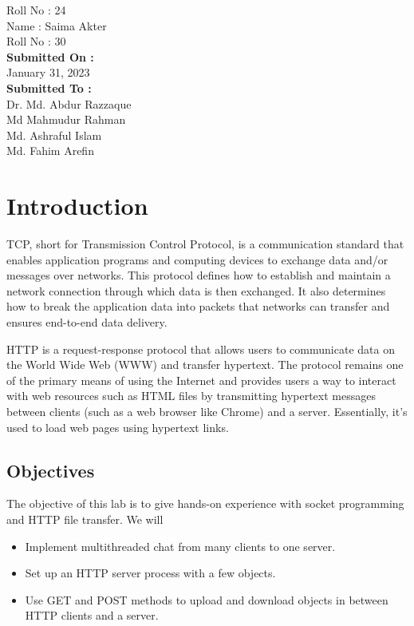 \documentclass[11pt]{article}
\begin{document}
\begin{titlepage}
\begin{large}
			Roll No : 24\\[12pt]
			Name : Saima Akter\\[8pt]
			Roll No : 30\\[12pt]
		\textbf{Submitted On : \\[12pt]}
			January 31, 2023\\[20pt]
		\textbf{Submitted To :\\[12pt]}
			Dr. Md. Abdur Razzaque\\[12pt]
                Md Mahmudur Rahman\\[12pt]
                Md. Ashraful Islam\\[12pt]
                Md. Fahim Arefin
	\end{large}
\end{titlepage}

\section{Introduction}

TCP, short for Transmission Control Protocol, is a communication standard that enables application programs and computing devices to exchange data and/or messages over networks. This protocol defines how to establish and maintain a network connection through which data is then exchanged. It also determines how to break the application data into packets that networks can transfer and ensures end-to-end data delivery. 

HTTP is a request-response protocol that allows users to communicate data on the World Wide Web (WWW) and transfer hypertext. The protocol remains one of the primary means of using the Internet and provides users a way to interact with web resources such as HTML files by transmitting hypertext messages between clients (such as a web browser like Chrome) and a server. Essentially, it’s used to load web pages using hypertext links.


\subsection{Objectives}
The objective of this lab is to give hands-on experience with socket programming and HTTP file transfer. We will 
\begin{itemize}
    \item Implement multithreaded chat from many clients to one server.
    \item Set up an HTTP server process with a few objects.
    \item Use GET and POST methods to upload and download objects in between HTTP clients and a server.
\end{itemize}
\end{document}
